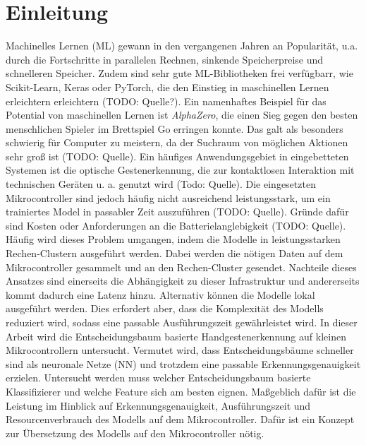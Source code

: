 \chapter{Einleitung}
Machinelles Lernen (ML) gewann in den vergangenen Jahren an Popularität, u.a. durch die Fortschritte in parallelen Rechnen,
sinkende Speicherpreise und schnelleren Speicher. Zudem sind sehr gute ML-Bibliotheken frei verfügbarr, wie Scikit-Learn, Keras oder PyTorch, die
den Einstieg in maschinellen Lernen erleichtern erleichtern (TODO: Quelle?). Ein namenhaftes Beispiel für das Potential von maschinellen Lernen ist \textit{AlphaZero},
die einen Sieg gegen den besten menschlichen Spieler im Brettspiel Go erringen konnte. Das galt als besonders schwierig für Computer zu meistern,
da der Suchraum von möglichen Aktionen sehr groß ist (TODO: Quelle).
\newline
\newline
Ein häufiges Anwendungsgebiet in eingebetteten Systemen ist die optische Gestenerkennung, die zur kontaktlosen Interaktion mit technischen Geräten u. a. genutzt wird (Todo: Quelle).
Die eingesetzten Mikrocontroller sind jedoch häufig nicht ausreichend leistungsstark, um ein trainiertes Model in passabler Zeit auszuführen (TODO: Quelle). Gründe dafür sind
Kosten oder Anforderungen an die Batterielanglebigkeit (TODO: Quelle). Häufig wird dieses Problem umgangen, indem die Modelle in leistungsstarken Rechen-Clustern ausgeführt werden.
Dabei werden die nötigen Daten auf dem Mikrocontroller gesammelt und an den Rechen-Cluster gesendet. Nachteile dieses Ansatzes sind einerseits die Abhängigkeit zu dieser
Infrastruktur und andererseits kommt dadurch eine Latenz hinzu. Alternativ können die Modelle lokal ausgeführt werden. Dies erfordert aber, dass die Komplexität des Modells reduziert wird,
sodass eine passable Ausführungszeit gewährleistet wird.
\newline
\newline
In dieser Arbeit wird die Entscheidungsbaum basierte Handgestenerkennung auf kleinen Mikrocontrollern untersucht. Vermutet wird, dass Entscheidungsbäume schneller sind als neuronale Netze (NN) und
trotzdem eine passable Erkennungsgenauigkeit erzielen. Untersucht werden muss welcher Entscheidungsbaum basierte Klassifizierer und welche Feature sich am besten eignen. Maßgeblich dafür ist die Leistung
im Hinblick auf Erkennungsgenauigkeit, Ausführungszeit und Resourcenverbrauch des Modells auf dem Mikrocontroller. Dafür ist ein Konzept zur Übersetzung des Modells auf den Mikrocontroller nötig.
\newline

